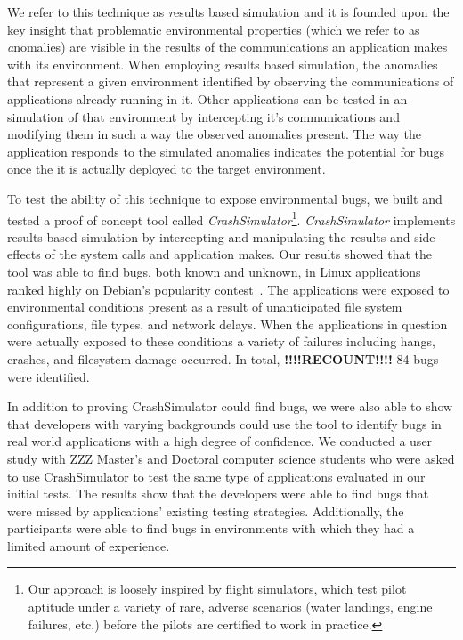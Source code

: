We refer to this technique as {\textit results based simulation}
and it is founded upon the key insight
that problematic environmental properties
(which we refer to as {\textit anomalies})
are visible in the results of the communications
an application makes with its environment.
When employing {\textit results based simulation},
the anomalies that represent a given environment
identified by
observing the communications of applications already running in it.
Other applications can be tested in an simulation of that environment
by intercepting it's communications
and modifying them in such a way
the observed anomalies present.
The way the application responds to the simulated anomalies
indicates the potential for bugs once the it is actually deployed
to the target environment.

To test the ability of this technique to expose environmental
bugs, we built and tested a proof of concept tool
called {\em CrashSimulator}\footnote{Our approach is
loosely inspired by flight simulators, which test pilot aptitude under a
variety of rare, adverse scenarios (water landings, engine failures, etc.)
before the pilots are certified to work in practice.}.
{\em CrashSimulator} implements {\texit results based simulation}
by intercepting and manipulating the results and side-effects
of the system calls and application makes.
Our results showed that the tool was able to find bugs,
both known and unknown,
in Linux applications ranked highly on Debian's popularity
contest~\cite{DebPopCon}.  The applications were exposed to
environmental conditions present as a result of unanticipated
file system configurations, file types, and network delays.
When the applications in
question were actually exposed to these conditions a variety of failures
including hangs, crashes, and filesystem damage occurred.  In total,
\textbf{!!!!RECOUNT!!!!} 84
bugs were identified.

In addition to proving CrashSimulator could find bugs, we were also able to
show that developers with varying backgrounds
could use the tool to identify bugs
in real world applications
with a high degree of confidence.
We conducted a user study with
ZZZ Master's and Doctoral computer science students
who were asked to use CrashSimulator to test
the same type of applications evaluated in our initial tests.
The results show that the developers were able to find bugs
that were missed by applications' existing testing strategies.
Additionally, the
participants were able to find bugs
in environments with which they had a limited amount of experience.

